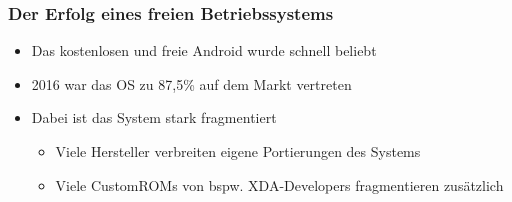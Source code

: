 \begin{frame}
\frametitle{Der Erfolg eines freien Betriebssystems}
	\begin{itemize}
		\item Das kostenlosen und freie Android wurde schnell beliebt
		\item 2016 war das OS zu 87,5\% auf dem Markt vertreten
		\item Dabei ist das System stark fragmentiert
		\begin{itemize}
			\item Viele Hersteller verbreiten eigene Portierungen des Systems
			\item Viele CustomROMs von bspw. XDA-Developers fragmentieren zusätzlich 
		\end{itemize}
	\end{itemize}
\end{frame}

